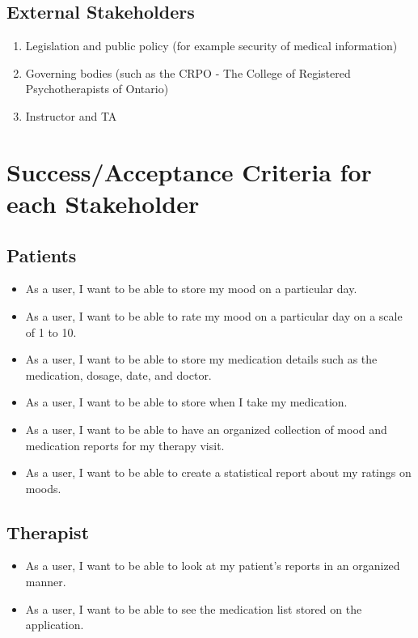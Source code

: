 \documentclass[11pt]{article}
\begin{document}
    \subsection{External Stakeholders}\label{subsec:external-stakeholders}
    \begin{enumerate}
        \item Legislation and public policy (for example security of medical information)
        \item Governing bodies (such as the CRPO - The College of Registered Psychotherapists of Ontario)
        \item Instructor and TA
    \end{enumerate}


    \section{Success/Acceptance Criteria for each Stakeholder}\label{sec:success/acceptance-criteria-for-each-stakeholder}

    \subsection{Patients}\label{subsec:patients}
     \begin{itemize}
         \item As a user, I want to be able to store my mood on a particular day.
         \item As a user, I want to be able to rate my mood on a particular day on a scale of 1 to 10.
         \item As a user, I want to be able to store my medication details such as the medication, dosage, date, and doctor.
         \item As a user, I want to be able to store when I take my medication.
         \item As a user, I want to be able to have an organized collection of mood and medication reports for my therapy visit.
         \item As a user, I want to be able to create a statistical report about my ratings on moods.

     \end{itemize}

     \subsection{Therapist}\label{subsec:therapist}
     \begin{itemize}
         \item As a user, I want to be able to look at my patient's reports in an organized manner.
         \item As a user, I want to be able to see the medication list stored on the application.

     \end{itemize}
\end{document}
